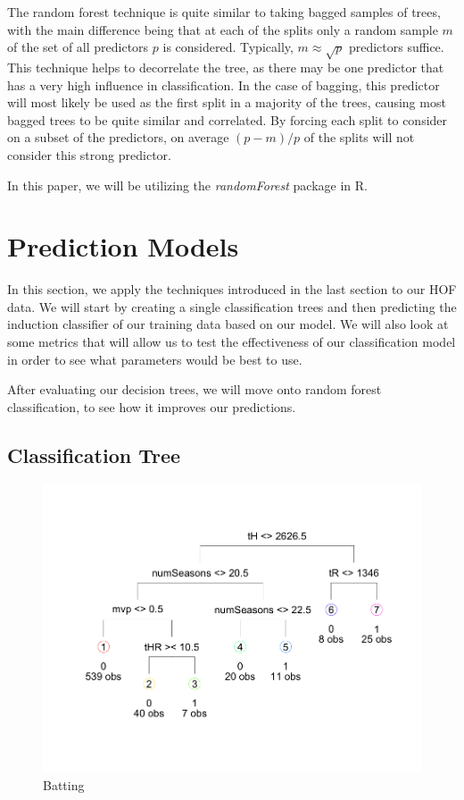 \documentclass[preprint,12pt]{elsarticle}
\begin{document}
The random forest technique is quite similar to taking bagged  samples of trees, with the main difference being that at each of the splits only a random sample $m$ of the set of all predictors $p$ is considered. Typically, $m \approx \sqrt{p}$ predictors suffice. This technique helps to decorrelate the tree, as there may be one predictor that has a very high influence in classification. In the case of bagging, this predictor will most likely be used as the first split in a majority of the trees, causing most bagged trees to be quite similar and correlated. By forcing each split to consider on a subset of the predictors, on average $(p-m)/p$ of the splits will not consider this strong predictor\cite{Breiman2001}.


In this paper, we will be utilizing the \textit{randomForest} package in R. 

\section{Prediction Models}

In this section, we apply the techniques introduced in the last section to our HOF data. We will start by creating a single classification trees and then predicting the induction classifier of our training data based on our model. We will also look at some metrics that will allow us to test the effectiveness of our classification model in order to see what parameters would be best to use. 

After evaluating our decision trees, we will move onto random forest classification, to see how it improves our predictions. 

\subsection{Classification Tree}

\begin{figure}[h]
       \centering 
       \includegraphics[width=\linewidth]{BatterUnpruned}
       \caption{Batting}
       \label{unprunedBat}
 \end{figure}
\end{document}
